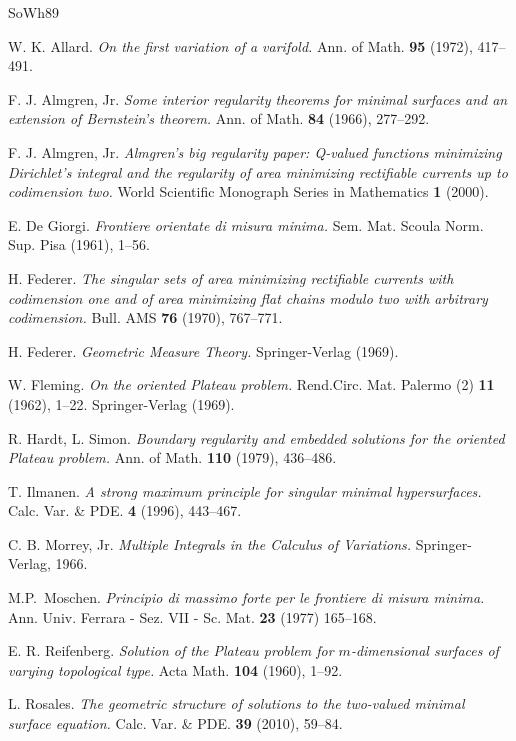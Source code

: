 \documentclass[a4paper,11pt]{amsart}
\begin{document}
\begin{thebibliography}{SoWh89}

 W. K. Allard.
\textit{On the first variation of a varifold.}
Ann. of Math. {\bf 95} (1972), 417--491.

 F. J. Almgren, Jr. 
\textit{Some interior regularity theorems for minimal surfaces and an extension of Bernstein's theorem.}
Ann. of Math. {\bf 84} (1966), 277--292.
  

 F. J. Almgren, Jr. 
\textit{Almgren's big regularity paper: Q-valued functions minimizing Dirichlet's integral and the regularity
of area minimizing rectifiable currents up to codimension two.} 
World Scientific Monograph Series in Mathematics {\bf 1} (2000).

 E. De Giorgi. 
\textit{Frontiere orientate di misura minima.} 
Sem. Mat. Scoula Norm. Sup. Pisa  (1961), 1--56.

 H. Federer.
\textit{The singular sets of area minimizing rectifiable currents with codimension one and of area minimizing flat chains modulo two with arbitrary codimension.}
Bull. AMS {\bf 76} (1970), 767--771.

 H. Federer.
\textit{Geometric Measure Theory.}
Springer-Verlag (1969).

 W. Fleming.
\textit{On the oriented Plateau problem.}
Rend.Circ. Mat. Palermo (2) {\bf 11} (1962), 1--22.
Springer-Verlag (1969).

 R. Hardt, L. Simon.  
\textit{Boundary regularity and embedded solutions for the oriented Plateau problem.} Ann. of
Math. {\bf 110} (1979), 436--486.

 T. Ilmanen.
\textit{A strong maximum principle for singular minimal hypersurfaces.}
Calc. Var. \& PDE. {\bf 4} (1996), 443--467.

 C. B. Morrey, Jr.
\textit{Multiple Integrals in the Calculus of Variations.}
Springer-Verlag, 1966.

 M.P.~Moschen.
\textit{Principio di massimo forte per le frontiere di misura minima.} 
Ann. Univ. Ferrara - Sez. VII - Sc. Mat. {\bf 23} (1977) 165--168.

 E. R. Reifenberg.
\textit{Solution of the Plateau problem for $m$-dimensional surfaces of varying topological type.}
Acta Math. {\bf 104} (1960), 1--92.

 L. Rosales. 
\textit{The geometric structure of solutions to the two-valued minimal surface equation.}
Calc. Var. \& PDE. {\bf 39} (2010), 59--84.
 

\end{thebibliography}
\end{document}
